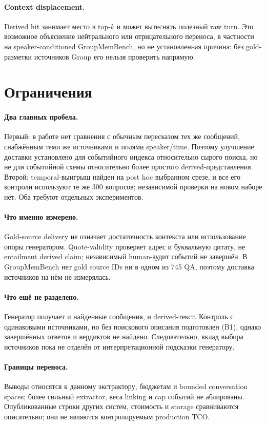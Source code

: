 \documentclass[11pt,a4paper]{article}
\begin{document}
\paragraph{Context displacement.}
Derived hit занимает место в top-$k$ и может вытеснять полезный raw turn. Это
возможное объяснение нейтрального или отрицательного переноса, в частности на
speaker-conditioned GroupMemBench, но не установленная причина: без gold-разметки
источников Group его нельзя проверить напрямую.

\section{Ограничения}
\label{sec:limits}

\paragraph{Два главных пробела.}
Первый: в работе нет сравнения с обычным пересказом тех же сообщений,
снабжённым теми же источниками и полями speaker/time. Поэтому улучшение доставки
установлено для событийного индекса относительно сырого поиска, но не для
событийной схемы относительно более простого derived-представления. Второй:
temporal-выигрыш найден на post hoc выбранном срезе, и все его контроли
используют те же 300 вопросов; независимой проверки на новом наборе нет. Оба требуют
отдельных экспериментов.

\paragraph{Что именно измерено.}
Gold-source delivery не означает достаточность контекста или использование
опоры генератором. Quote-validity проверяет адрес и буквальную цитату, не
entailment derived claim; независимый human-аудит событий не завершён. В
GroupMemBench нет gold source IDs ни в одном из 745 QA, поэтому доставка
источников на нём не измерялась.

\paragraph{Что ещё не разделено.}
Генератор получает и найденные сообщения, и derived-текст. Контроль с
одинаковыми источниками, но без поискового описания подготовлен (B1), однако
завершённых ответов и вердиктов не найдено. Следовательно, вклад выбора
источников пока не отделён от интерпретационной подсказки генератору.

\paragraph{Границы переноса.}
Выводы относятся к данному экстрактору, бюджетам и
bounded conversation spaces; более сильный extractor, веса linking и cap
событий не аблированы. Опубликованные строки других систем, стоимость и storage
сравниваются описательно; они не являются контролируемым production TCO.
\end{document}
